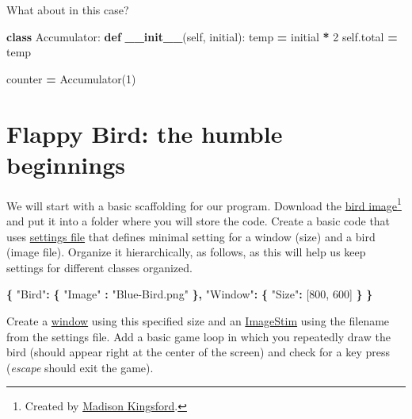 \documentclass[
]{book}
\newenvironment{Shaded}{\begin{snugshade}}{\end{snugshade}}
\newcommand{\DataTypeTok}[1]{\textcolor[rgb]{0.13,0.29,0.53}{#1}}
\newcommand{\DecValTok}[1]{\textcolor[rgb]{0.00,0.00,0.81}{#1}}
\newcommand{\FunctionTok}[1]{\textcolor[rgb]{0.13,0.29,0.53}{\textbf{#1}}}
\newcommand{\KeywordTok}[1]{\textcolor[rgb]{0.13,0.29,0.53}{\textbf{#1}}}
\newcommand{\NormalTok}[1]{#1}
\newcommand{\OperatorTok}[1]{\textcolor[rgb]{0.81,0.36,0.00}{\textbf{#1}}}
\newcommand{\OtherTok}[1]{\textcolor[rgb]{0.56,0.35,0.01}{#1}}
\newcommand{\StringTok}[1]{\textcolor[rgb]{0.31,0.60,0.02}{#1}}
\newcommand{\VariableTok}[1]{\textcolor[rgb]{0.00,0.00,0.00}{#1}}
\begin{document}
What about in this case?

\begin{Shaded}
\begin{Highlighting}[]
\KeywordTok{class}\NormalTok{ Accumulator:}
    \KeywordTok{def} \FunctionTok{\_\_init\_\_}\NormalTok{(}\VariableTok{self}\NormalTok{, initial):}
\NormalTok{        temp }\OperatorTok{=}\NormalTok{ initial }\OperatorTok{*} \DecValTok{2}
        \VariableTok{self}\NormalTok{.total }\OperatorTok{=}\NormalTok{ temp}
        
\NormalTok{counter }\OperatorTok{=}\NormalTok{ Accumulator(}\DecValTok{1}\NormalTok{)}
\end{Highlighting}
\end{Shaded}

\hypertarget{flappy-bird-the-humble-beginnings}{%
\section{Flappy Bird: the humble beginnings}\label{flappy-bird-the-humble-beginnings}}

We will start with a basic scaffolding for our program. Download the \href{material/Blue-Bird.png}{bird image}\footnote{Created by \href{https://openclipart.org/artist/Scout}{Madison Kingsford}.} and put it into a folder where you will store the code. Create a basic code that uses \href{settings-files}{settings file} that defines minimal setting for a window (size) and a bird (image file). Organize it hierarchically, as follows, as this will help us keep settings for different classes organized.

\begin{Shaded}
\begin{Highlighting}[]
\FunctionTok{\{}
  \DataTypeTok{"Bird"}\FunctionTok{:} \FunctionTok{\{}
    \DataTypeTok{"Image"} \FunctionTok{:} \StringTok{"Blue{-}Bird.png"}
  \FunctionTok{\},}
  \DataTypeTok{"Window"}\FunctionTok{:} \FunctionTok{\{}
    \DataTypeTok{"Size"}\FunctionTok{:} \OtherTok{[}\DecValTok{800}\OtherTok{,} \DecValTok{600}\OtherTok{]}
  \FunctionTok{\}}
\FunctionTok{\}}
\end{Highlighting}
\end{Shaded}

Create a \href{https://psychopy.org/api/visual/window.html\#psychopy.visual.Window}{window} using this specified size and an \href{https://psychopy.org/api/visual/imagestim.html\#psychopy.visual.ImageStim}{ImageStim} using the filename from the settings file. Add a basic game loop in which you repeatedly draw the bird (should appear right at the center of the screen) and check for a key press (\emph{escape} should exit the game).
\end{document}

